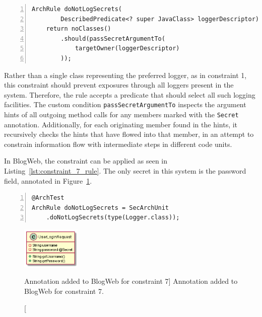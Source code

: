 \begin{minipage}{\linewidth}
\begin{lstlisting}[caption={Rule definition for constraint 7.}, captionpos=b, label=lst:constraint_7_impl, numbers=left]
ArchRule doNotLogSecrets(
        DescribedPredicate<? super JavaClass> loggerDescriptor) {
    return noClasses()
        .should(passSecretArgumentTo(
            targetOwner(loggerDescriptor)
        ));
\end{lstlisting}
\end{minipage}

Rather than a single class representing the preferred logger, as in constraint 1, this constraint should prevent exposures through all loggers present in the system. Therefore, the rule accepts a predicate that should select all such logging facilities. The custom condition \texttt{passSecretArgumentTo} inspects the argument hints of all outgoing method calls for any members marked with the \texttt{Secret} annotation. Additionally, for each originating member found in the hints, it recursively checks the hints that have flowed into that member, in an attempt to constrain information flow with intermediate steps in different code units.

In BlogWeb, the constraint can be applied as seen in Listing~\ref{lst:constraint_7_rule}. The only secret in this system is the password field, annotated in Figure~\ref{fig:secrets_toy_system}.

\begin{minipage}{\linewidth}
\begin{lstlisting}[caption={Application of constraint 7 to BlogWeb.}, captionpos=b, label=lst:constraint_7_rule, numbers=left]
@ArchTest
ArchRule doNotLogSecrets = SecArchUnit
    .doNotLogSecrets(type(Logger.class));
\end{lstlisting}
\end{minipage}

\begin{figure}[H]
    \centering
    \includegraphics[width=0.25\textwidth]{figure/toyexamples/Secrets.png}
    \caption
        [Annotation added to BlogWeb for constraint 7]
        {Annotation added to BlogWeb for constraint 7.}
    \label{fig:secrets_toy_system}
\end{figure}